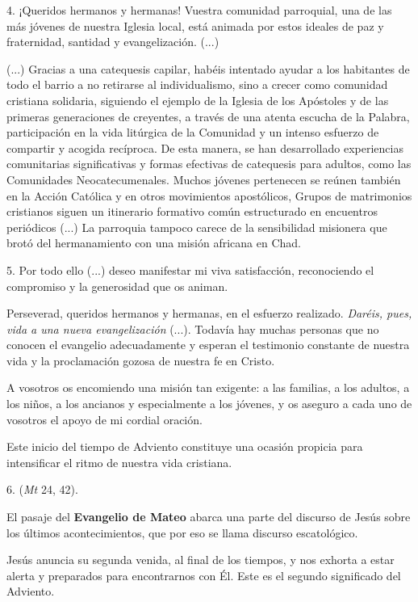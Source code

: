 \begin{body}
\begin{body}
		4. ¡Queridos hermanos y hermanas! Vuestra comunidad parroquial, una de las más jóvenes de nuestra Iglesia local, está animada por estos ideales de paz y fraternidad, santidad y evangelización. (...)
		
		(...) Gracias a una catequesis capilar, habéis intentado ayudar a los habitantes de todo el barrio a no retirarse al individualismo, sino a crecer como comunidad cristiana solidaria, siguiendo el ejemplo de la Iglesia de los Apóstoles y de las primeras generaciones de creyentes, a través de una atenta escucha de la Palabra, participación en la vida litúrgica de la Comunidad y un intenso esfuerzo de compartir y acogida recíproca. De esta manera, se han desarrollado experiencias comunitarias significativas y formas efectivas de catequesis para adultos, como las Comunidades Neocatecumenales. Muchos jóvenes pertenecen se reúnen también en la Acción Católica y en otros movimientos apostólicos, Grupos de matrimonios cristianos siguen un itinerario formativo común estructurado en encuentros periódicos (...) La parroquia tampoco carece de la sensibilidad misionera que brotó del hermanamiento con una misión africana en Chad.
		
		5. Por todo ello (...) deseo manifestar mi viva satisfacción, reconociendo el compromiso y la generosidad que os animan.
		
		Perseverad, queridos hermanos y hermanas, en el esfuerzo realizado. \emph{Daréis, pues, vida a una nueva evangelización} (...). Todavía hay muchas personas que no conocen el evangelio adecuadamente y esperan el testimonio constante de nuestra vida y la proclamación gozosa de nuestra fe en Cristo.
		
		A vosotros os encomiendo una misión tan exigente: a las familias, a los adultos, a los niños, a los ancianos y especialmente a los jóvenes, y os aseguro a cada uno de vosotros el apoyo de mi cordial oración.
		
		Este inicio del tiempo de Adviento constituye una ocasión propicia para intensificar el ritmo de nuestra vida cristiana.
		
		6.  (\emph{Mt} 24, 42).
		
		El pasaje del \textbf{Evangelio de Mateo} abarca una parte del discurso de Jesús sobre los últimos acontecimientos, que por eso se llama discurso escatológico.
		
		Jesús anuncia su segunda venida, al final de los tiempos, y nos exhorta a estar alerta y preparados para encontrarnos con Él. Este es el segundo significado del Adviento.
		

\end{body}
\end{body}
